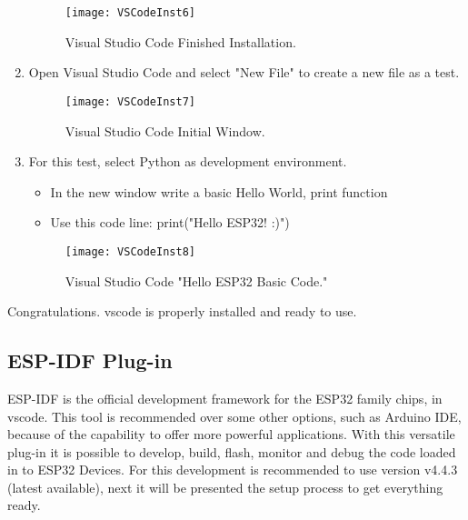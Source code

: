 \begin{enumerate}
\begin{figure}  [H]
		\begin{center}
			\texttt{[image: VSCodeInst6]}
			\caption{Visual Studio Code Finished Installation.} 
			\label{fig:Visual Studio Code Finished Installation.}
		\end{center}
	\end{figure}
	\item Open Visual Studio Code and select "New File" to create a new file as a test.
	\begin{figure}  [H]
		\begin{center}
			\texttt{[image: VSCodeInst7]}
			\caption{Visual Studio Code Initial Window.} 
			\label{fig:Visual Studio Code Initial Window.}
		\end{center}
	\end{figure}
	\item For this test, select Python as development environment. 
	 \begin{itemize}
	 	\item In the new window write a basic Hello World, print function
	 	\item Use this code line: print("Hello ESP32! :)")
	\end{itemize}
	\begin{figure}  [H]
		\begin{center}
	 	\texttt{[image: VSCodeInst8]}
	 	\caption{Visual Studio Code "Hello ESP32 Basic Code."} 
	 	\label{fig:Visual Studio Code "Hello ESP32 Basic Code."}
	 	\end{center}
 	\end{figure}
\end{enumerate}

Congratulations. \ac{vscode} is properly installed and ready to use.

\subsection{ESP-IDF Plug-in}
ESP-IDF is the official development framework for the ESP32 family chips, in \ac{vscode}. This tool is recommended over some other options, such as Arduino IDE, because of the capability to offer more powerful applications. With this versatile plug-in it is possible to develop, build, flash, monitor and debug the code loaded in to ESP32 Devices. For this development is recommended to use version v4.4.3 (latest available), next it will be presented the setup process to get everything ready.


